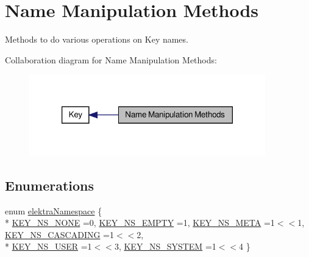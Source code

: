 \hypertarget{group__keyname}{\section{Name Manipulation Methods}
\label{group__keyname}
}


Methods to do various operations on Key names.  


Collaboration diagram for Name Manipulation Methods\-:
\nopagebreak
\begin{figure}[H]
\begin{center}
\leavevmode
\includegraphics[width=290pt]{group__keyname}
\end{center}
\end{figure}
\subsection*{Enumerations}
\begin{DoxyCompactItemize}
\item 
enum \hyperlink{group__keyname_gaec3b8d6f430ae49b91bafe8a86310a68}{elektra\-Namespace} \{ \\*
\hyperlink{group__keyname_ggaec3b8d6f430ae49b91bafe8a86310a68a3659698b0a07454ca8055ab693e8efd1}{K\-E\-Y\-\_\-\-N\-S\-\_\-\-N\-O\-N\-E} =0, 
\hyperlink{group__keyname_ggaec3b8d6f430ae49b91bafe8a86310a68a33d6c53529b4e6921d0b1d6565df2f1f}{K\-E\-Y\-\_\-\-N\-S\-\_\-\-E\-M\-P\-T\-Y} =1, 
\hyperlink{group__keyname_ggaec3b8d6f430ae49b91bafe8a86310a68ac5fbf2c3a7ae79fa2d60c48ae3e72688}{K\-E\-Y\-\_\-\-N\-S\-\_\-\-M\-E\-T\-A} =1$<$$<$1, 
\hyperlink{group__keyname_ggaec3b8d6f430ae49b91bafe8a86310a68a2c9133e3095dccbcde5ca3bb13987b5d}{K\-E\-Y\-\_\-\-N\-S\-\_\-\-C\-A\-S\-C\-A\-D\-I\-N\-G} =1$<$$<$2, 
\\*
\hyperlink{group__keyname_ggaec3b8d6f430ae49b91bafe8a86310a68a8ce23c70010e8ac8bb540b0947e03a4e}{K\-E\-Y\-\_\-\-N\-S\-\_\-\-U\-S\-E\-R} =1$<$$<$3, 
\hyperlink{group__keyname_ggaec3b8d6f430ae49b91bafe8a86310a68a61adca2f9dff47e65dfcdb492ffa7a20}{K\-E\-Y\-\_\-\-N\-S\-\_\-\-S\-Y\-S\-T\-E\-M} =1$<$$<$4
 \}
\end{DoxyCompactItemize}
